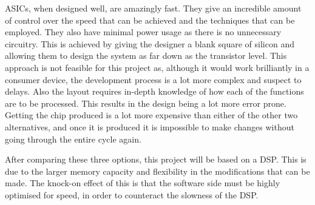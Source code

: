 ASICs, when designed well, are amazingly fast.
They give an incredible amount of control over the speed that can be achieved and the techniques that can be employed.
They also have minimal power usage as there is no unnecessary circuitry.
This is achieved by giving the designer a blank square of silicon and allowing them to design the system as far down as the transistor level.
This approach is not feasible for this project as, although it would work brilliantly in a consumer device, the development process is a lot more complex and suspect to delays.
Also the layout requires in-depth knowledge of how each of the functions are to be processed.
This results in the design being a lot more error prone.
Getting the chip produced is a lot more expensive than either of the other two alternatives, and once it is produced it is impossible to make changes without going through the entire cycle again.

After comparing these three options, this project will be based on a DSP.
This is due to the larger memory capacity and flexibility in the modifications that can be made.
The knock-on effect of this is that the software side must be highly optimised for speed, in order to counteract the slowness of the DSP. 
